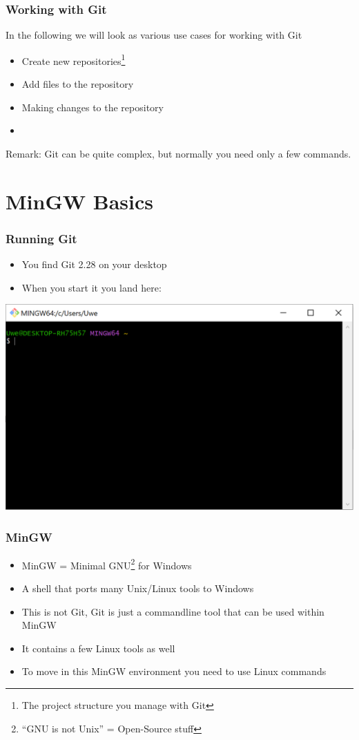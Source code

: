 \documentclass[12pt,english]{beamer}
\begin{document}
\begin{frame}
\frametitle{Working with Git}

In the following we will look as various use cases for working with Git

\begin{itemize}
\item Create new repositories\footnote{The project structure you manage with Git}
\item Add files to the repository
\item Making changes to the repository
\item 
\end{itemize}

Remark: Git can be quite complex, but normally you need only a few commands.

\end{frame}

\section{MinGW Basics}

\begin{frame}
\frametitle{Running Git}

\begin{itemize}
\item You find Git 2.28 on your desktop
\item When you start it you land here:
\end{itemize}

\includegraphics[width=\textwidth]{mingw-01}
\end{frame}
 
\begin{frame}
\frametitle{MinGW}

\begin{itemize}
\item MinGW = Minimal GNU\footnote{\enquote{GNU is not Unix} = Open-Source stuff} for Windows
\item A shell that ports many Unix/Linux tools to Windows
\item This is not Git, Git is just a commandline tool that can be used within MinGW
\item It contains a few Linux tools as well
\item To move in this MinGW environment you need to use Linux commands
\end{itemize}
\end{frame}
\end{document}
